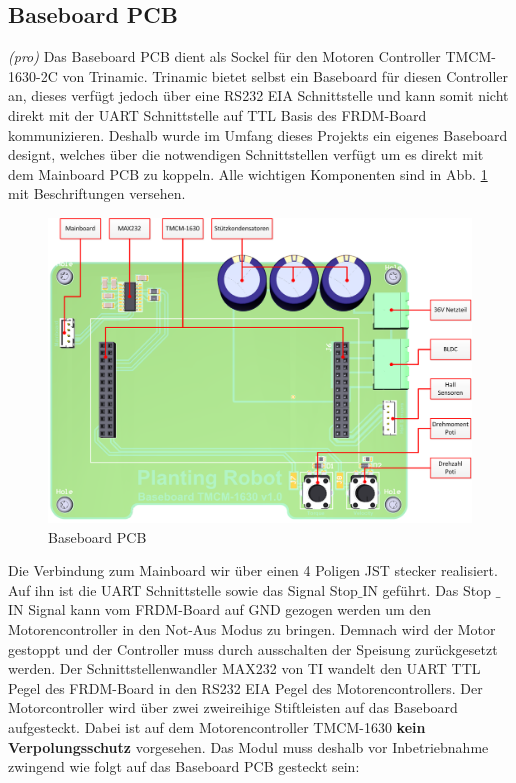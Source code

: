 \subsection{Baseboard PCB}
\textit{(pro)}
Das Baseboard PCB dient als Sockel für den Motoren Controller TMCM-1630-2C von Trinamic. Trinamic bietet selbst ein Baseboard für diesen Controller an, dieses verfügt jedoch über eine RS232 EIA Schnittstelle und kann somit nicht direkt mit der UART Schnittstelle auf TTL Basis des FRDM-Board kommunizieren. Deshalb wurde im Umfang dieses Projekts ein eigenes Baseboard designt, welches über die notwendigen Schnittstellen verfügt um es direkt mit dem Mainboard PCB zu koppeln. Alle wichtigen Komponenten sind in Abb. \ref{fig:Baseboard_3D} mit Beschriftungen versehen.

\begin{figure}[H]
	\includegraphics[width=1\textwidth]{Illustrationen/6-Umsetzung/Baseboard_3D_TOP.png}
	\caption{Baseboard PCB}
	\label{fig:Baseboard_3D}
\end{figure}

Die Verbindung zum Mainboard wir über einen 4 Poligen JST stecker realisiert. Auf ihn ist die UART Schnittstelle sowie das Signal Stop$\_$IN geführt. Das Stop $\_$IN Signal kann vom FRDM-Board auf GND gezogen werden um den Motorencontroller in den Not-Aus Modus zu bringen. Demnach wird der Motor gestoppt und der Controller muss durch ausschalten der Speisung zurückgesetzt werden. Der Schnittstellenwandler MAX232 von TI wandelt den UART TTL Pegel des FRDM-Board in den RS232 EIA Pegel des Motorencontrollers. Der Motorcontroller wird über zwei zweireihige Stiftleisten auf das Baseboard aufgesteckt. Dabei ist auf dem Motorencontroller TMCM-1630 \textbf{kein Verpolungsschutz} vorgesehen. Das Modul muss deshalb vor Inbetriebnahme zwingend wie folgt auf das Baseboard PCB gesteckt sein:

